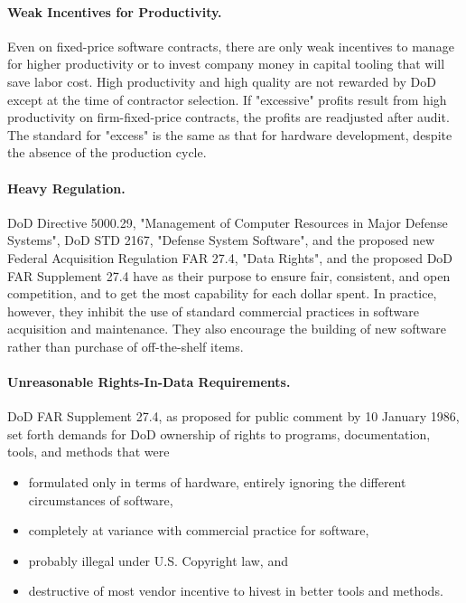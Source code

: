 \documentclass[12pt]{article}
\begin{document}
\paragraph{Weak Incentives for Productivity.}  Even on fixed-price software
contracts, there are only weak incentives to manage for higher productivity or
to invest company money in capital tooling that will save labor cost. High
productivity and high quality are not rewarded by DoD except at the time of
contractor selection. If "excessive" profits result from high productivity on
firm-fixed-price contracts, the profits are readjusted after audit. The
standard for "excess" is the same as that for hardware development, despite the
absence of the production cycle.

\paragraph{Heavy Regulation.} DoD Directive 5000.29, "Management of Computer
Resources in Major Defense Systems", DoD STD 2167, "Defense System Software",
and the proposed new Federal Acquisition Regulation FAR 27.4, "Data Rights",
and the proposed DoD FAR Supplement 27.4 have as their purpose to ensure fair,
consistent, and open competition, and to get the most capability for each
dollar spent. In practice, however, they inhibit the use of standard commercial
practices in software acquisition and maintenance. They also encourage the
building of new software rather than purchase of off-the-shelf items.

\paragraph{Unreasonable Rights-In-Data Requirements.}  DoD FAR Supplement 27.4,
as proposed for public comment by 10 January 1986, set forth demands for DoD
ownership of rights to programs, documentation, tools, and methods that were

\begin{itemize}
    \item formulated only in terms of hardware, entirely ignoring the different circumstances of software,
    \item completely at variance with commercial practice for software,
    \item probably illegal under U.S. Copyright law, and
    \item destructive of most vendor incentive to hivest in better tools and methods.
\end{itemize}
\end{document}
